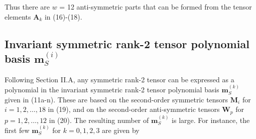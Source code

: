 Thus there are $w$ = 12 anti-symmetric parts that can be formed from the tensor elements $\mathbf{A}_k$ in (16)-(18).  

\subsection{Invariant symmetric rank-2 tensor polynomial basis $\mathbf{m}^{(i)}_S$}

Following Section II.A, any symmetric rank-2 tensor can be expressed as a polynomial in the invariant symmetric rank-2 tensor polynomial basis  $\mathbf{m}^{(k)}_S$ given in (11a-n).  These are based on the second-order symmetric tensors  $\mathbf{M}_i$ for $ i =1,2, \ldots ,18$ in (19), and on the second-order anti-symmetric tensors $\mathbf{W}_p$  for $p =1,2, \ldots ,12$  in (20).  The resulting number of $\mathbf{m}^{(k)}_S$ is large.  For instance, the first few  $\mathbf{m}^{(k)}_S$ for $k = 0, 1, 2, 3$ are given by 
	

